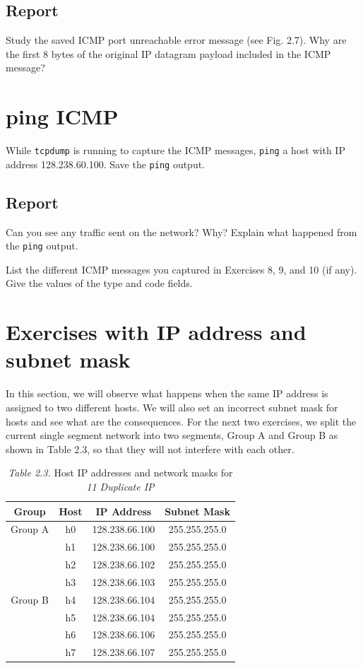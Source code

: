 \documentclass{../UTNetLab}
\begin{document}
    \subsection*{Report}
    Study the saved ICMP port unreachable error message (see Fig. 2.7).
    Why are the first 8 bytes of the original IP datagram payload included in the ICMP message?

\section{ping ICMP}
    While \lstinline{tcpdump} is running to capture the ICMP messages, \lstinline{ping} a host with IP address 128.238.60.100. Save the \lstinline{ping} output.
    
    \subsection*{Report}
    Can you see any traffic sent on the network? Why? Explain what happened from the \lstinline{ping} output.

    List the different ICMP messages you captured in Exercises 8, 9, and 10 (if any). Give the values of the type and code fields.

\section*{Exercises with IP address and subnet mask}
    In this section, we will observe what happens when the same IP address is assigned to two different hosts.
    We will also set an incorrect subnet mask for hosts and see what are the consequences.
    For the next two exercises, we split the current single segment network into two segments, Group A and Group B as shown in Table 2.3, so that they will not interfere with each other.

    \begin{table}[H]
        \caption{\textit{Table 2.3.} Host IP addresses and network masks for \textit{11 Duplicate IP}}
        \centering
        \begin{tabular}{ c c c c }
            \hline \hline
            Group & Host & IP Address & Subnet Mask \\
            \hline 
            Group A & h0 & 128.238.66.100 & 255.255.255.0 \\
                    & h1 & 128.238.66.100 & 255.255.255.0 \\
                    & h2 & 128.238.66.102 & 255.255.255.0 \\
                    & h3 & 128.238.66.103 & 255.255.255.0 \\
                    \hline
            Group B & h4 & 128.238.66.104 & 255.255.255.0 \\
                    & h5 & 128.238.66.104 & 255.255.255.0 \\
                    & h6 & 128.238.66.106 & 255.255.255.0 \\
                    & h7 & 128.238.66.107 & 255.255.255.0 \\
            \hline \hline
            \end{tabular}
    \end{table}
\end{document}
